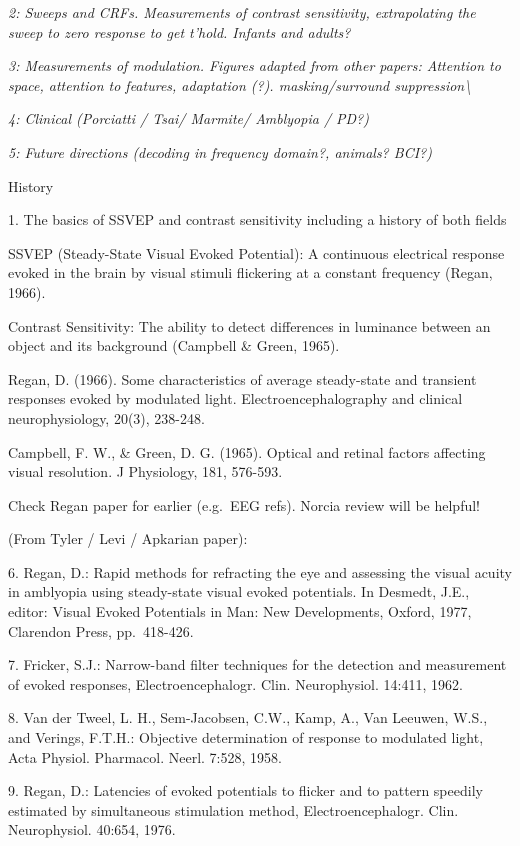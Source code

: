 \documentclass[
  letterpaper,
  DIV=11,
  numbers=noendperiod]{scrartcl}
\begin{document}
\emph{2: Sweeps and CRFs. Measurements of contrast sensitivity,
extrapolating the sweep to zero response to get t'hold. Infants and
adults?}

\emph{3: Measurements of modulation. Figures adapted from other papers:
Attention to space, attention to features, adaptation (?).
masking/surround suppression\textbackslash{}}

\emph{4: Clinical (Porciatti / Tsai/ Marmite/ Amblyopia / PD?)}

\emph{5: Future directions (decoding in frequency domain?, animals?
BCI?)}

\label{anchor-2}{}History

\label{anchor-3}{}1. The basics of SSVEP and contrast
sensitivity including a history of both fields

SSVEP (Steady-State Visual Evoked Potential): A continuous electrical
response evoked in the brain by visual stimuli flickering at a constant
frequency (Regan, 1966).

Contrast Sensitivity: The ability to detect differences in luminance
between an object and its background (Campbell \& Green, 1965).

Regan, D. (1966). Some characteristics of average steady-state and
transient responses evoked by modulated light. Electroencephalography
and clinical neurophysiology, 20(3), 238-248.

Campbell, F. W., \& Green, D. G. (1965). Optical and retinal factors
affecting visual resolution. J Physiology, 181, 576-593.

Check Regan paper for earlier (e.g.~EEG refs). Norcia review will be
helpful!

(From Tyler / Levi / Apkarian paper):

6. Regan, D.: Rapid methods for refracting the eye and assessing the
visual acuity in amblyopia using steady-state visual evoked potentials.
In Desmedt, J.E., editor: Visual Evoked Potentials in Man: New
Developments, Oxford, 1977, Clarendon Press, pp.~418-426.

7. Fricker, S.J.: Narrow-band filter techniques for the detection and
measurement of evoked responses, Electroencephalogr. Clin. Neurophysiol.
14:411, 1962.

8. Van der Tweel, L. H., Sem-Jacobsen, C.W., Kamp, A., Van Leeuwen,
W.S., and Verings, F.T.H.: Objective determination of response to
modulated light, Acta Physiol. Pharmacol. Neerl. 7:528, 1958.

9. Regan, D.: Latencies of evoked potentials to flicker and to pattern
speedily estimated by simultaneous stimulation method,
Electroencephalogr. Clin. Neurophysiol. 40:654, 1976.
\end{document}
